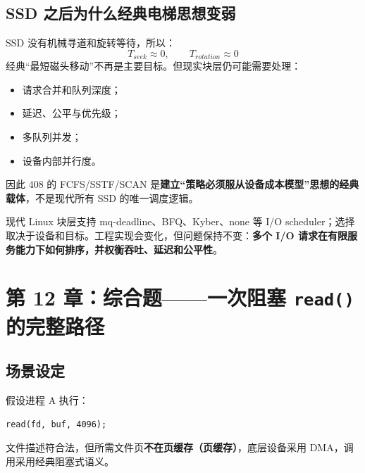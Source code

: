 \documentclass[11pt,a4paper]{ctexart}
\newcommand{\kw}[1]{\textbf{#1}}
\newcommand{\code}[1]{\texttt{#1}}
\begin{document}
\subsection{SSD 之后为什么经典电梯思想变弱}
SSD 没有机械寻道和旋转等待，所以：
\[
T_{seek}\approx 0,\qquad T_{rotation}\approx 0
\]
经典“最短磁头移动”不再是主要目标。但现实块层仍可能需要处理：
\begin{itemize}
  \item 请求合并和队列深度；
  \item 延迟、公平与优先级；
  \item 多队列并发；
  \item 设备内部并行度。
\end{itemize}
因此 408 的 FCFS/SSTF/SCAN 是\kw{建立“策略必须服从设备成本模型”思想的经典载体}，不是现代所有 SSD 的唯一调度逻辑。

\begin{eng}
现代 Linux 块层支持 mq-deadline、BFQ、Kyber、none 等 I/O scheduler；选择取决于设备和目标。工程实现会变化，但问题保持不变：\kw{多个 I/O 请求在有限服务能力下如何排序，并权衡吞吐、延迟和公平性}。
\end{eng}

\section{第 12 章：综合题——一次阻塞 \code{read()} 的完整路径}

\subsection{场景设定}
假设进程 A 执行：
\begin{lstlisting}
read(fd, buf, 4096);
\end{lstlisting}
文件描述符合法，但所需文件页\kw{不在页缓存（页缓存）}，底层设备采用 DMA，调用采用经典阻塞式语义。
\end{document}
